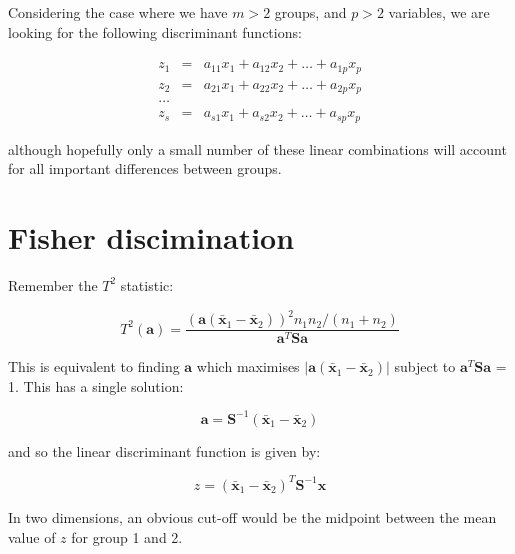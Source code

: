 Considering the case where we have $m > 2$ groups, and $p > 2$ variables, we are looking for the following discriminant functions:


\begin{eqnarray*}
z_{1} &=& a_{11}x_{1} + a_{12}x_{2} + \ldots + a_{1p}x_{p}\\
z_{2} &=& a_{21}x_{1} + a_{22}x_{2} + \ldots + a_{2p}x_{p}\\
\ldots\\
z_{s} &=& a_{s1}x_{1} + a_{s2}x_{2} + \ldots + a_{sp}x_{p}
\end{eqnarray*}

although hopefully only  a small number of these linear combinations will account for all important differences between groups.

\section{Fisher discimination}
\label{fisherdisc}

Remember the $T^{2}$ statistic:

\begin{equation}
T^{2}(\boldsymbol{a}) = \frac{ \left( \boldsymbol{a} (\boldsymbol{\bar{x}}_{1} - \boldsymbol{\bar{x}}_{2} ) \right)^{2} n_{1}n_{2}/(n_{1}+n_{2})}{\boldsymbol{a}^{T}\boldsymbol{S}\boldsymbol{a}}
\end{equation}

This is equivalent to finding $\boldsymbol{a}$ which maximises $|\boldsymbol{a} (\boldsymbol{\bar{x}}_{1} - \boldsymbol{\bar{x}}_{2} ) |$ subject to $\boldsymbol{a}^{T}\boldsymbol{S}\boldsymbol{a}$ = 1.   This has a single solution:

\begin{displaymath}
\boldsymbol{a} = \boldsymbol{S}^{-1}(\boldsymbol{\bar{x}}_{1} - \boldsymbol{\bar{x}}_{2} )
\end{displaymath}

and so the linear discriminant function is given by:

\begin{displaymath}
z = (\boldsymbol{\bar{x}}_{1} - \boldsymbol{\bar{x}}_{2} )^{T}\boldsymbol{S}^{-1} \boldsymbol{x}
\end{displaymath}

In two dimensions, an obvious cut-off would be the midpoint between the mean value of $z$ for group 1 and 2.


